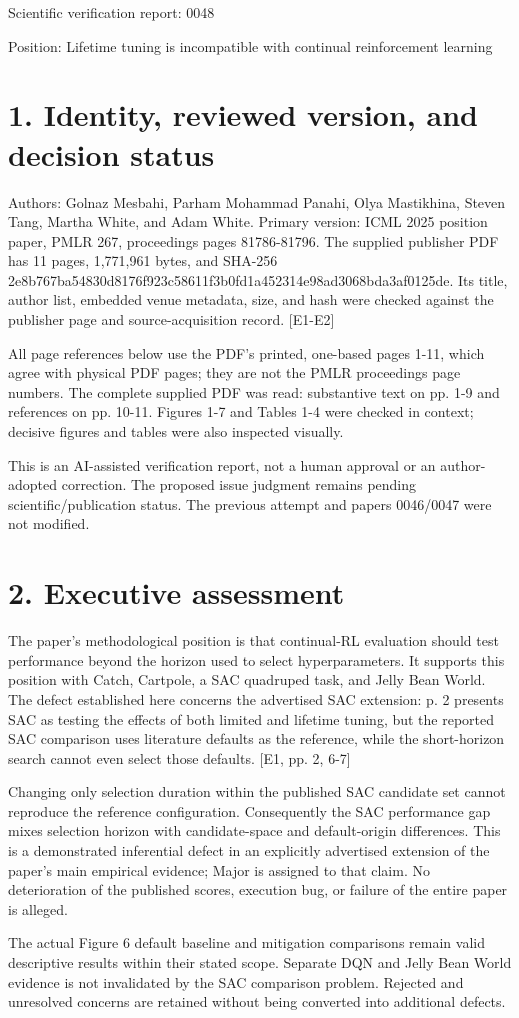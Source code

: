 \documentclass[10pt]{article}
\begin{document}
Scientific verification report: 0048\par
Position: Lifetime tuning is incompatible with continual reinforcement learning\par
\section*{1. Identity, reviewed version, and decision status}
Authors: Golnaz Mesbahi, Parham Mohammad Panahi, Olya Mastikhina, Steven Tang, Martha White, and Adam White. Primary version: ICML 2025 position paper, PMLR 267, proceedings pages 81786-81796. The supplied publisher PDF has 11 pages, 1,771,961 bytes, and SHA-256 2e8b767ba54830d8176f923c58611f3b0fd1a452314e98ad3068bda3af0125de. Its title, author list, embedded venue metadata, size, and hash were checked against the publisher page and source-acquisition record. [E1-E2]\par
All page references below use the PDF’s printed, one-based pages 1-11, which agree with physical PDF pages; they are not the PMLR proceedings page numbers. The complete supplied PDF was read: substantive text on pp. 1-9 and references on pp. 10-11. Figures 1-7 and Tables 1-4 were checked in context; decisive figures and tables were also inspected visually.\par
This is an AI-assisted verification report, not a human approval or an author-adopted correction. The proposed issue judgment remains pending scientific/publication status. The previous attempt and papers 0046/0047 were not modified.\par
\section*{2. Executive assessment}
The paper’s methodological position is that continual-RL evaluation should test performance beyond the horizon used to select hyperparameters. It supports this position with Catch, Cartpole, a SAC quadruped task, and Jelly Bean World. The defect established here concerns the advertised SAC extension: p. 2 presents SAC as testing the effects of both limited and lifetime tuning, but the reported SAC comparison uses literature defaults as the reference, while the short-horizon search cannot even select those defaults. [E1, pp. 2, 6-7]\par
Changing only selection duration within the published SAC candidate set cannot reproduce the reference configuration. Consequently the SAC performance gap mixes selection horizon with candidate-space and default-origin differences. This is a demonstrated inferential defect in an explicitly advertised extension of the paper’s main empirical evidence; Major is assigned to that claim. No deterioration of the published scores, execution bug, or failure of the entire paper is alleged.\par
The actual Figure 6 default baseline and mitigation comparisons remain valid descriptive results within their stated scope. Separate DQN and Jelly Bean World evidence is not invalidated by the SAC comparison problem. Rejected and unresolved concerns are retained without being converted into additional defects.\par
\end{document}
